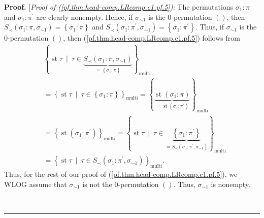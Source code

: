\documentclass[numbers=enddot,12pt,final,onecolumn,notitlepage]{scrartcl}%
\theoremstyle{definition}
\newenvironment{proof}[1][Proof]{\noindent\textbf{#1.} }{\ \rule{0.5em}{0.5em}}
\begin{document}
\begin{proof}
[\textit{Proof of (\ref{pf.thm.head-comp.LRcomp.c1.pf.5}):} The permutations
$\sigma_{1}:\pi$ and $\sigma_{1}:\pi^{\prime}$ are clearly nonempty. Hence, if
$\sigma_{\sim1}$ is the $0$-permutation $\left(  {}\right)  $, then
$S_{\prec}\left(  \sigma_{1}:\pi,\sigma_{\sim1}\right)  =\left\{  \sigma
_{1}:\pi\right\}  $ and $S_{\prec}\left(  \sigma_{1}:\pi^{\prime},\sigma
_{\sim1}\right)  =\left\{  \sigma_{1}:\pi^{\prime}\right\}  $. Thus, if
$\sigma_{\sim1}$ is the $0$-permutation $\left(  {}\right)  $, then
(\ref{pf.thm.head-comp.LRcomp.c1.pf.5}) follows from%
\begin{align*}
&  \left\{  \operatorname{st} \tau   \ \mid\ \tau\in
\underbrace{S_{\prec}\left(  \sigma_{1}:\pi,\sigma_{\sim1}\right)
}_{=\left\{  \sigma_{1}:\pi\right\}  }\right\}  _{\operatorname*{multi}}\\
&  =\left\{  \operatorname{st} \tau   \ \mid\ \tau\in\left\{
\sigma_{1}:\pi\right\}  \right\}  _{\operatorname*{multi}}=\left\{
\underbrace{\operatorname{st}\left(  \sigma_{1}:\pi\right)  }%
_{=\operatorname{st}\left(  \sigma_{1}:\pi^{\prime}\right)  }\right\}
_{\operatorname*{multi}}\\
&  =\left\{  \operatorname{st}\left(  \sigma_{1}:\pi^{\prime}\right)
\right\}  _{\operatorname*{multi}}=\left\{  \operatorname{st} \tau
\ \mid\ \tau\in\underbrace{\left\{  \sigma_{1}:\pi^{\prime
}\right\}  }_{=S_{\prec}\left(  \sigma_{1}:\pi^{\prime},\sigma_{\sim1}\right)
}\right\}  _{\operatorname*{multi}}\\
&  =\left\{  \operatorname{st} \tau   \ \mid\ \tau\in S_{\prec
}\left(  \sigma_{1}:\pi^{\prime},\sigma_{\sim1}\right)  \right\}
_{\operatorname*{multi}}.
\end{align*}
Thus, for the rest of our proof of (\ref{pf.thm.head-comp.LRcomp.c1.pf.5}), we
WLOG assume that $\sigma_{\sim1}$ is not the $0$-permutation $\left(
{}\right)  $. Thus, $\sigma_{\sim1}$ is nonempty.


\end{proof}
\end{document}
